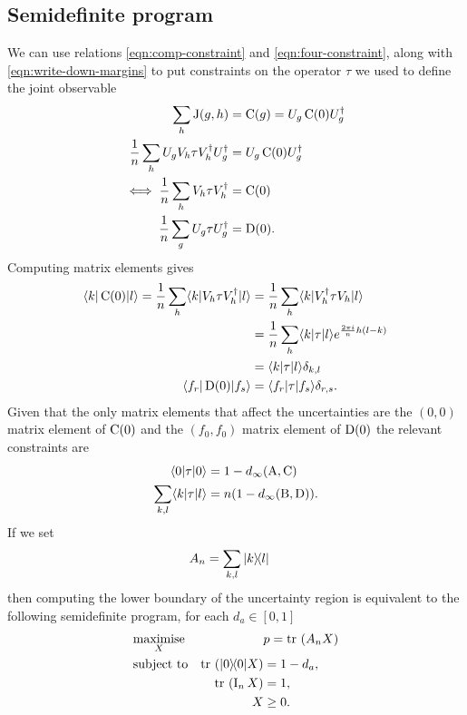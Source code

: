 \subsection{Semidefinite program}
We can use relations \eqref{eqn:comp-constraint} and \eqref{eqn:four-constraint}, along with \eqref{eqn:write-down-margins} to put constraints on the operator $\tau$ we used to define the joint observable
\begin{align}
  \sum_h \operatorname{J}(g,h) &= \operatorname{C}(g) = U_g \operatorname{C}(0) U_g^\dagger\\
  \frac{1}{n} \sum_h U_gV_h \tau V_h^\dagger U_g^\dagger &= U_g \operatorname{C}(0) U_g^\dagger\\
  \iff \frac{1}{n} \sum_h V_h \tau V_h^\dagger  &=  \operatorname{C}(0)  \\
  \frac{1}{n} \sum_g U_g \tau U_g^\dagger  &=  \operatorname{D}(0).
\end{align}
Computing matrix elements gives
\begin{align}
  \langle k | \operatorname{C}(0) | l \rangle = \frac{1}{n} \sum_h \langle k | V_h \tau V_h^\dagger | l \rangle &= \frac{1}{n} \sum_h \langle k | V_h^\dagger \tau V_h | l \rangle \\
                                                                          &= \frac{1}{n} \sum_h \langle k |\tau | l \rangle e^{\frac{2\pi i}{n} h(l-k)}\\
                                                                          &= \langle k |\tau | l \rangle \delta_{k,l}\\
  \langle f_r | \operatorname{D}(0) | f_s \rangle &= \langle f_r |\tau | f_s \rangle \delta_{r,s}.
\end{align}
Given that the only matrix elements that affect the uncertainties are the $(0,0)$ matrix element of $\operatorname{C}(0)$ and the $(f_0, f_0)$ matrix element of $\operatorname{D}(0)$ the relevant constraints are
\begin{align}
  \langle 0 |\tau| 0 \rangle &= 1 - d_\infty(\operatorname{A},\operatorname{C})\\
  \sum_{k,l} \langle k |\tau| l \rangle &=  n(1- d_\infty(\operatorname{B},\operatorname{D})).
\end{align}
If we set 
\begin{align}
  A_n &= \sum_{k,l} |k\rangle\!\langle l|
\end{align}
then computing the lower boundary of the uncertainty region is equivalent to the following semidefinite program, for each $d_a\in [0,1]$
\begin{equation}
  \begin{aligned}
    & \underset{X}{\text{maximise}}
    & & p = \tr{A_n X} \\
    & \text{subject to}
    & \tr{\ketbra{0}{0} X} &= 1-d_a, \\
    &&  \tr{\opi_n  X} &= 1, \\
    && X &\geq 0.
  \end{aligned}
  \label{eqn:semidefinite-program}
\end{equation}
